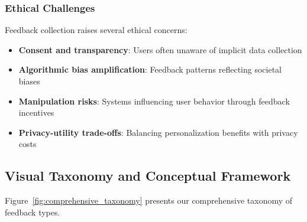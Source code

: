 \subsubsection{Ethical Challenges}

Feedback collection raises several ethical concerns:
\begin{itemize}
    \item \textbf{Consent and transparency}: Users often unaware of implicit data collection
    \item \textbf{Algorithmic bias amplification}: Feedback patterns reflecting societal biases
    \item \textbf{Manipulation risks}: Systems influencing user behavior through feedback incentives
    \item \textbf{Privacy-utility trade-offs}: Balancing personalization benefits with privacy costs
\end{itemize}

\subsection{Visual Taxonomy and Conceptual Framework}

Figure~\ref{fig:comprehensive_taxonomy} presents our comprehensive taxonomy of feedback types.

